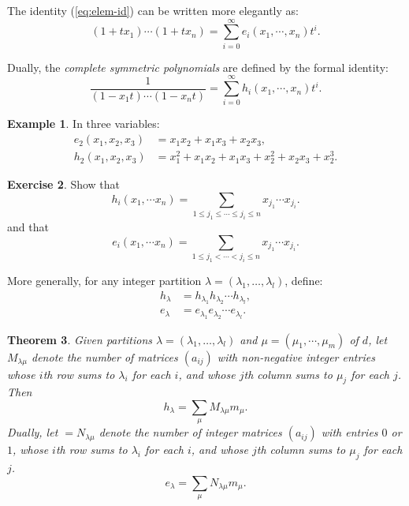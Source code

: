 \documentclass[11pt]{amsproc}
\newtheorem{theorem}{Theorem}[subsection]
\theoremstyle{definition}
\theoremstyle{example}
\newtheorem{example}[theorem]{Example}
\newtheorem{exercise}[theorem]{Exercise}
\begin{document}
The identity (\ref{eq:elem-id}) can be written more elegantly as:
\begin{displaymath}
  (1+t x_1) \dotsb (1+tx_n) = \sum_{i=0}^\infty e_i(x_1,\dotsb, x_n)t^i.
\end{displaymath}

Dually, the \emph{complete symmetric polynomials} are defined by the formal identity:
\begin{displaymath}
  \frac 1{(1-x_1t)\dotsb (1-x_nt)} = \sum_{i=0}^\infty h_i(x_1,\dotsb, x_n)t^i.
\end{displaymath}
\begin{example}
  In three variables:
  \begin{align*}
    e_2(x_1,x_2,x_3) & = x_1x_2 + x_1x_3 + x_2x_3,\\
    h_2(x_1,x_2,x_3) & = x_1^2 + x_1x_2 + x_1x_3 + x_2^2 + x_2x_3 + x_2^3.
  \end{align*}
\end{example}
\begin{exercise}
  Show that
  \begin{displaymath}
    h_i(x_1,\dotsb x_n) = \sum_{1\leq j_1\leq \dotsb \leq j_i\leq n} x_{j_1}\dotsb x_{j_i}.
  \end{displaymath}
  and that
  \begin{displaymath}
    e_i(x_1,\dotsb x_n) = \sum_{1\leq j_1< \dotsb < j_i\leq n} x_{j_1}\dotsb x_{j_i}.
  \end{displaymath}
\end{exercise}
More generally, for any integer partition $\lambda=(\lambda_1,\dotsc, \lambda_l)$, define:
\begin{align*}
  h_\lambda &= h_{\lambda_1} h_{\lambda_2}\dotsb h_{\lambda_l},\\
  e_\lambda &= e_{\lambda_1} e_{\lambda_2}\dotsb e_{\lambda_l}.
\end{align*}
\begin{theorem}
  Given partitions $\lambda=(\lambda_1,\dotsc,\lambda_l)$ and $\mu=(\mu_1,\dotsb, \mu_m)$ of $d$, let $M_{\lambda\mu}$ denote the number of matrices $(a_{ij})$ with non-negative integer entries whose $i$th row sums to $\lambda_i$ for each $i$, and whose $j$th column sums to $\mu_j$ for each $j$.
  Then
  \begin{displaymath}
    h_\lambda = \sum_\mu M_{\lambda\mu} m_\mu.
  \end{displaymath}
  Dually, let $=N_{\lambda\mu}$ denote the number of integer matrices $(a_{ij})$ with entries $0$ or $1$, whose $i$th row sums to $\lambda_i$ for each $i$, and whose $j$th column sums to $\mu_j$ for each $j$.
  \begin{displaymath}
    e_\lambda = \sum_\mu N_{\lambda\mu} m_\mu.
  \end{displaymath}
\end{theorem}
\end{document}
